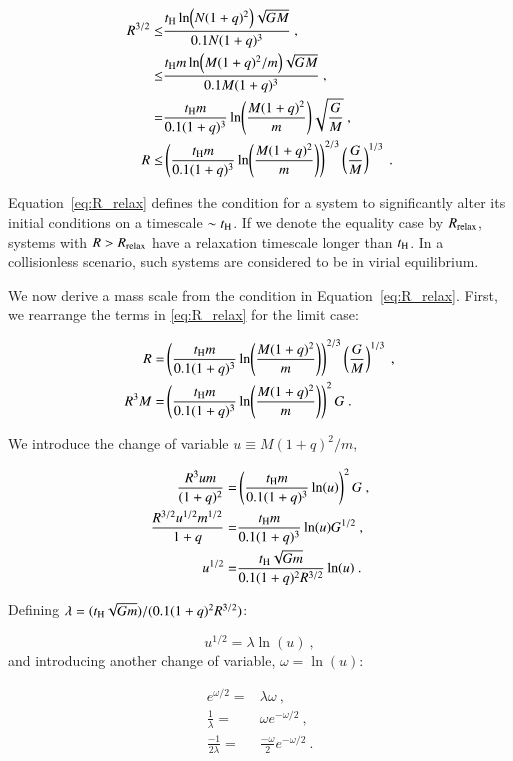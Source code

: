 \begin{appendixs}
	\begin{align}
		R^{3/2} \leq & \frac{t_{\rm H} \ln(N(1+q)^2) \sqrt{GM}}{0.1 N(1+q)^3 }~,\\
		\leq & \frac{t_{\rm H} m \ln(M(1+q)^2/m) \sqrt{GM}}{0.1 M(1+q)^3} ~,\\ 
		=& \frac{t_{\rm H}m}{0.1(1+q)^3} \ln(\frac{M(1+q)^2}{m}) \sqrt{\frac{G}{M}} ~,\\
		R \leq& \left(\frac{t_{\rm H}m}{0.1(1+q)^3} \ln(\frac{M(1+q)^2}{m})\right)^{2/3} \left(\frac{G}{M}\right)^{1/3}~.
		\label{eq:R_relax}
	\end{align}
	
	Equation~\eqref{eq:R_relax} defines the condition for a system to significantly alter its initial conditions on a timescale $\sim t_{\rm H}$. If we denote the equality case by $R_{\rm relax}$, systems with $R > R_{\rm relax}$ have a relaxation timescale longer than $t_{\rm H}$. In a collisionless scenario, such systems are considered to be in virial equilibrium.
	
	We now derive a mass scale from the condition in Equation~\eqref{eq:R_relax}. First, we rearrange the terms in \eqref{eq:R_relax} for the limit case:
	
	\begin{align}
		R =& \left(\frac{t_{\rm H}m}{0.1(1+q)^3} \ln(\frac{M(1+q)^2}{m})\right)^{2/3} \left(\frac{G}{M}\right)^{1/3} ~,\\
		R^3 M =& \left(\frac{t_{\rm H}m}{0.1(1+q)^3} \ln(\frac{M(1+q)^2}{m})\right)^2 G~.
	\end{align}
	
	We introduce the change of variable $u\equiv M(1+q)^2/m$,
	
	\begin{align}
		\frac{R^3um}{(1+q)^2} =& \left(\frac{t_{\rm H}m}{0.1(1+q)^3} \ln(u)\right)^2 G ~,\\
		\frac{R^{3/2}u^{1/2}m^{1/2}}{1+q} =& \frac{t_{\rm H}m}{0.1(1+q)^3} \ln(u) G^{1/2} ~,\\
		u^{1/2} =& \frac{t_{\rm H}\sqrt{Gm}}{0.1(1+q)^2R^{3/2}} \ln(u)~.
	\end{align}
	
	Defining $\lambda = (t_{\rm H}\sqrt{Gm})/(0.1(1+q)^2R^{3/2})$:
	
	\begin{equation}
		u^{1/2} = \lambda \ln(u)~,
	\end{equation}
	and introducing another change of variable, $\omega = \ln(u)$:
	
	\begin{align}
		e^{\omega/2} =& \lambda \omega ~,\\
		\frac{1}{\lambda} =& \omega e^{-\omega/2} ~,\\
		\frac{-1}{2\lambda} =& \frac{- \omega}{2}e^{-\omega/2}~.
		\label{eq:omega_lambert}
	\end{align}
	

\end{appendixs}
